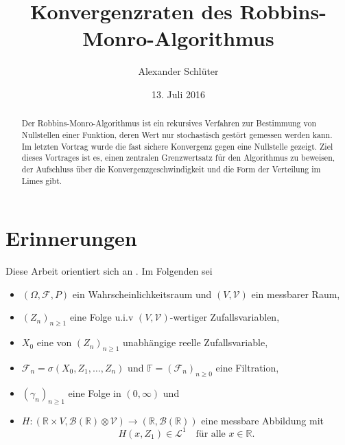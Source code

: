 \documentclass[ngerman,a4paper,11pt]{scrartcl}
\newcommand{\FF}{\mathbb{F}}
\newcommand{\RR}{\mathbb{R}}
\newcommand{\bb}{\mathcal{B}}
\newcommand{\ff}{\mathcal{F}}
\renewcommand{\ll}{\mathcal{L}}
\newcommand{\vv}{\mathcal{V}}
\newcommand{\zspace}{V}
\newcommand{\zsigma}{\vv}
\newcommand{\interv}{\RR}
\begin{document}
\title{Konvergenzraten des Robbins-Monro-Algorithmus}
\author{Alexander Schlüter}
\date{13. Juli 2016}
\maketitle
\begin{abstract}
  Der Robbins-Monro-Algorithmus ist ein rekursives Verfahren zur Bestimmung von
  Nullstellen einer Funktion, deren Wert nur stochastisch gestört gemessen
  werden kann. Im letzten Vortrag wurde die fast sichere Konvergenz gegen eine
  Nullstelle gezeigt. Ziel dieses Vortrages ist es, einen zentralen
  Grenzwertsatz für den Algorithmus zu beweisen, der Aufschluss über die
  Konvergenzgeschwindigkeit und die Form der Verteilung im Limes gibt.
\end{abstract}
\tableofcontents

\section{Erinnerungen}
Diese Arbeit orientiert sich an \cite[Kapitel 11.1]{lusch}. Im Folgenden sei    
\begin{itemize}
\item $(\Omega, \ff, P)$ ein Wahrscheinlichkeitsraum und $(\zspace,\zsigma)$ ein messbarer Raum,
\item $(Z_n)_{n\geq 1}$ eine Folge u.i.v $(\zspace, \zsigma)$-wertiger Zufallsvariablen,
\item $X_0$ eine von $(Z_n)_{n\geq 1}$ unabhängige reelle Zufallsvariable,
\item $\ff_n=\sigma(X_0,Z_1,\dotsc,Z_n)$ und $\FF=(\ff_n)_{n\geq 0}$ eine Filtration,
\item $(\gamma_n)_{n\geq 1}$ eine Folge in $(0,\infty)$ und
\item $H:(\interv\times \zspace,\bb(\interv)\otimes\zsigma)\to(\RR,\bb(\RR))$ eine messbare
  Abbildung mit
  \begin{equation*}
    H(x,Z_1)\in\ll^1\quad\text{für alle $x\in \interv$.}
  \end{equation*}
\end{itemize}
\end{document}
